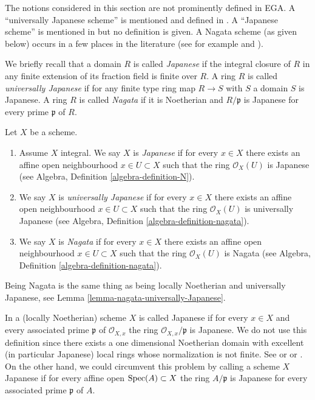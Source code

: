\noindent
The notions considered in this section are not prominently defined in EGA.
A ``universally Japanese scheme'' is mentioned and defined in
\cite[IV Corollary 5.11.4]{EGA}. A ``Japanese scheme'' is mentioned in
\cite[IV Remark 10.4.14 (ii)]{EGA} but no definition is given.
A Nagata scheme (as given below) occurs in a few
places in the literature (see for example \cite[Definition 8.2.30]{Liu} and
\cite[Page 142]{Greco}).

\medskip\noindent
We briefly recall that a domain $R$ is called {\it Japanese} if the integral
closure of $R$ in any finite extension of its fraction field is finite over
$R$. A ring $R$ is called {\it universally Japanese} if for any finite type
ring map $R \to S$ with $S$ a domain $S$ is Japanese. A ring $R$ is called
{\it Nagata} if it is Noetherian and $R/\mathfrak p$ is Japanese for every
prime $\mathfrak p$ of $R$.

\begin{definition}
\label{definition-nagata}
Let $X$ be a scheme.
\begin{enumerate}
\item Assume $X$ integral. We say $X$ is {\it Japanese}
if for every $x \in X$ there exists an
affine open neighbourhood $x \in U \subset X$ such that the ring
$\mathcal{O}_X(U)$ is Japanese (see
Algebra, Definition \ref{algebra-definition-N}).
\item We say $X$ is {\it universally Japanese} if for every $x \in X$
there exists an affine open neighbourhood $x \in U \subset X$ such that
the ring $\mathcal{O}_X(U)$ is universally Japanese (see
Algebra, Definition \ref{algebra-definition-nagata}).
\item We say $X$ is {\it Nagata} if for every $x \in X$ there exists an
affine open neighbourhood $x \in U \subset X$ such that the ring
$\mathcal{O}_X(U)$ is Nagata (see
Algebra, Definition \ref{algebra-definition-nagata}).
\end{enumerate}
\end{definition}

\noindent
Being Nagata is the same thing as being locally Noetherian
and universally Japanese, see
Lemma \ref{lemma-nagata-universally-Japanese}.

\begin{remark}
\label{remark-non-integral-Japanese}
In \cite{Hoobler-finite} a (locally Noetherian) scheme $X$ is called
Japanese if for every $x \in X$ and every associated prime $\mathfrak p$
of $\mathcal{O}_{X, x}$ the ring $\mathcal{O}_{X, x}/\mathfrak p$ is
Japanese. We do not use this definition since there exists a one
dimensional Noetherian domain with excellent (in particular
Japanese) local rings whose normalization is not finite. See
\cite[Example 1]{Hochster-loci} or \cite{Heinzer-Levy} or
\cite[Expos\'e XIX]{Traveaux}.
On the other hand, we could circumvent this problem by calling a scheme
$X$ Japanese if for every affine open $\mathop{\mathrm{Spec}}(A) \subset X$ the ring
$A/\mathfrak p$ is Japanese for every associated prime $\mathfrak p$ of $A$.
\end{remark}

